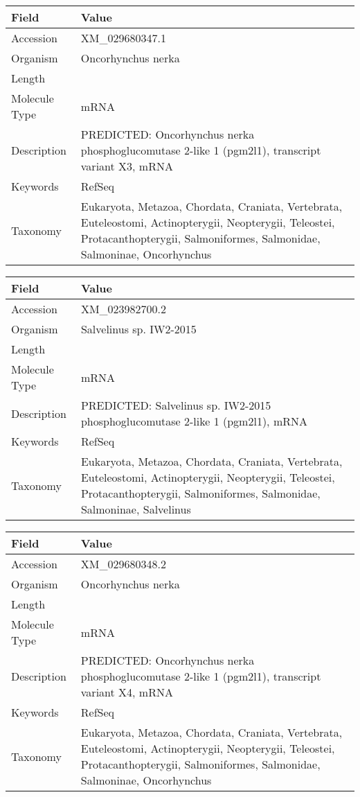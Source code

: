 \documentclass[10pt]{article}
\begin{document}
\vspace{1em}
{\footnotesize
\begin{longtable}{>{\raggedright\arraybackslash}p{4.5cm} >{\raggedright\arraybackslash}p{11.5cm}}
\textbf{Field} & \textbf{Value} \\
\hline
Accession & XM\_029680347.1 \\
Organism & Oncorhynchus nerka \\
Length & 3953 \\
Molecule Type & mRNA \\
Description & PREDICTED: Oncorhynchus nerka phosphoglucomutase 2-like 1 (pgm2l1), transcript variant X3, mRNA \\
Keywords & RefSeq \\
Taxonomy & Eukaryota, Metazoa, Chordata, Craniata, Vertebrata, Euteleostomi, Actinopterygii, Neopterygii, Teleostei, Protacanthopterygii, Salmoniformes, Salmonidae, Salmoninae, Oncorhynchus \\
\end{longtable}
}

\vspace{1em}
{\footnotesize
\begin{longtable}{>{\raggedright\arraybackslash}p{4.5cm} >{\raggedright\arraybackslash}p{11.5cm}}
\textbf{Field} & \textbf{Value} \\
\hline
Accession & XM\_023982700.2 \\
Organism & Salvelinus sp. IW2-2015 \\
Length & 2602 \\
Molecule Type & mRNA \\
Description & PREDICTED: Salvelinus sp. IW2-2015 phosphoglucomutase 2-like 1 (pgm2l1), mRNA \\
Keywords & RefSeq \\
Taxonomy & Eukaryota, Metazoa, Chordata, Craniata, Vertebrata, Euteleostomi, Actinopterygii, Neopterygii, Teleostei, Protacanthopterygii, Salmoniformes, Salmonidae, Salmoninae, Salvelinus \\
\end{longtable}
}

\vspace{1em}
{\footnotesize
\begin{longtable}{>{\raggedright\arraybackslash}p{4.5cm} >{\raggedright\arraybackslash}p{11.5cm}}
\textbf{Field} & \textbf{Value} \\
\hline
Accession & XM\_029680348.2 \\
Organism & Oncorhynchus nerka \\
Length & 3919 \\
Molecule Type & mRNA \\
Description & PREDICTED: Oncorhynchus nerka phosphoglucomutase 2-like 1 (pgm2l1), transcript variant X4, mRNA \\
Keywords & RefSeq \\
Taxonomy & Eukaryota, Metazoa, Chordata, Craniata, Vertebrata, Euteleostomi, Actinopterygii, Neopterygii, Teleostei, Protacanthopterygii, Salmoniformes, Salmonidae, Salmoninae, Oncorhynchus \\
\end{longtable}
}
\end{document}

